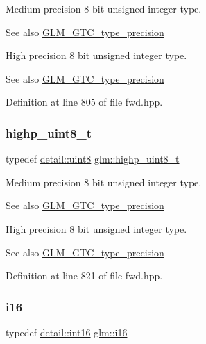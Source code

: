 Medium precision 8 bit unsigned integer type. \begin{DoxySeeAlso}{See also}
\mbox{\hyperlink{group__gtc__type__precision}{G\+L\+M\+\_\+\+G\+T\+C\+\_\+type\+\_\+precision}}
\end{DoxySeeAlso}
High precision 8 bit unsigned integer type. \begin{DoxySeeAlso}{See also}
\mbox{\hyperlink{group__gtc__type__precision}{G\+L\+M\+\_\+\+G\+T\+C\+\_\+type\+\_\+precision}} 
\end{DoxySeeAlso}


Definition at line 805 of file fwd.\+hpp.

\mbox{\label{group__gtc__type__precision_ga9ba529fcc75b82d23da979f0ce6e4518}} 
\subsubsection{\texorpdfstring{highp\_uint8\_t}{highp\_uint8\_t}}
{\footnotesize\ttfamily typedef \mbox{\hyperlink{namespaceglm_1_1detail_aef2588f97d090cc19fbbe0c74fe17c8f}{detail\+::uint8}} \mbox{\hyperlink{group__gtc__type__precision_ga9ba529fcc75b82d23da979f0ce6e4518}{glm\+::highp\+\_\+uint8\+\_\+t}}}

Medium precision 8 bit unsigned integer type. \begin{DoxySeeAlso}{See also}
\mbox{\hyperlink{group__gtc__type__precision}{G\+L\+M\+\_\+\+G\+T\+C\+\_\+type\+\_\+precision}}
\end{DoxySeeAlso}
High precision 8 bit unsigned integer type. \begin{DoxySeeAlso}{See also}
\mbox{\hyperlink{group__gtc__type__precision}{G\+L\+M\+\_\+\+G\+T\+C\+\_\+type\+\_\+precision}} 
\end{DoxySeeAlso}


Definition at line 821 of file fwd.\+hpp.

\mbox{\label{group__gtc__type__precision_ga35e5542ca05b29cc256fdafb8503d1fd}} 
\subsubsection{\texorpdfstring{i16}{i16}}
{\footnotesize\ttfamily typedef \mbox{\hyperlink{namespaceglm_1_1detail_a375938874ca4f0a0982ec6373b56117b}{detail\+::int16}} \mbox{\hyperlink{group__gtc__type__precision_ga35e5542ca05b29cc256fdafb8503d1fd}{glm\+::i16}}}

